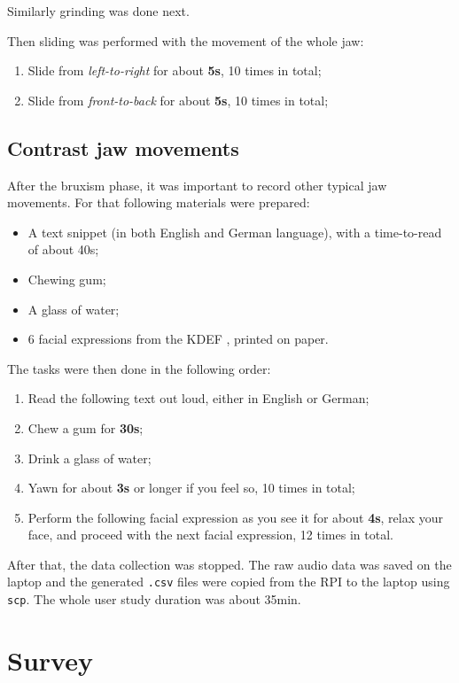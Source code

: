 Similarly grinding was done next.

Then sliding was performed with the movement of the whole jaw:
\begin{enumerate}
    \item Slide from \emph{left-to-right} for about \textbf{5s}, 10 times in total;
    \item Slide from \emph{front-to-back} for about \textbf{5s}, 10 times in total;
\end{enumerate}

\subsection{Contrast jaw movements}
After the bruxism phase, it was important to record other typical jaw movements. For that following materials were prepared:
\begin{itemize}
    \item A text snippet (in both English and German language), with a time-to-read of about 40s;
    \item Chewing gum;
    \item A glass of water;
    \item 6 facial expressions from the KDEF \cite{lundqvist1998karolinska}, printed on paper.
\end{itemize}

The tasks were then done in the following order:
\begin{enumerate}
    \item Read the following text out loud, either in English or German;
    \item Chew a gum for \textbf{30s};
    \item Drink a glass of water;
    \item Yawn for about \textbf{3s} or longer if you feel so, 10 times in total;
    \item Perform the following facial expression as you see it for about \textbf{4s}, relax your face, and proceed with the next facial expression, 12 times in total.
\end{enumerate}

After that, the data collection was stopped. The raw audio data was saved on the laptop and the generated \texttt{.csv} files were copied from the RPI to the laptop using \texttt{scp}. The whole user study duration was about 35min.


\section{Survey}

